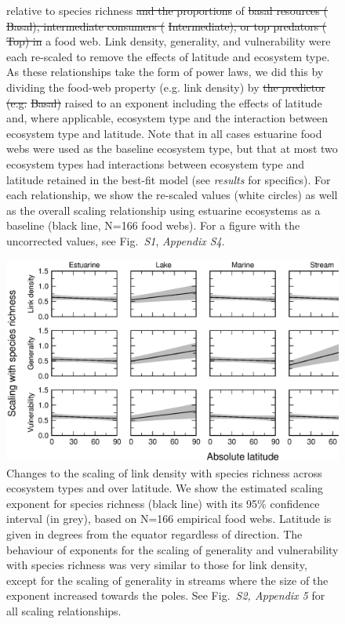 \documentclass[12pt]{article}
\providecommand{\DIFadd}[1]{{\protect\color{blue}\uwave{#1}}} %
\providecommand{\DIFdel}[1]{{\protect\color{red}\sout{#1}}}                      %
\providecommand{\DIFaddFL}[1]{\DIFadd{#1}} %
\providecommand{\DIFdelFL}[1]{\DIFdel{#1}} %
\providecommand{\DIFaddbeginFL}{} %
\providecommand{\DIFaddendFL}{} %
\providecommand{\DIFdelbeginFL}{} %
\providecommand{\DIFdelendFL}{} %
\begin{document}
\begin{figure}[h]
{relative to \DIFaddbeginFL \DIFaddFL{the }\DIFaddendFL species richness \DIFdelbeginFL \DIFdelFL{and the proportions }\DIFdelendFL of \DIFdelbeginFL \DIFdelFL{basal resources (}%
\DIFdelFL{Basal), intermediate 
consumers (}%
\DIFdelFL{Intermediate), or top predators (}%
\DIFdelFL{Top) in }\DIFdelendFL a food web. Link density, generality,
and vulnerability were each re-scaled to remove the effects of latitude and ecosystem
type. As these relationships take the form of power laws, we did this by dividing the food-web
property (e.g. link density) by \DIFdelbeginFL \DIFdelFL{the predictor (e.g. }%
\DIFdelFL{Basal) }\DIFdelendFL \DIFaddbeginFL \DIFaddFL{species richness }\DIFaddendFL raised to an exponent including the 
effects of latitude and, where applicable, ecosystem type and the interaction between ecosystem
type and latitude. Note that in all cases estuarine food webs were used as the baseline 
ecosystem type, but that at most two ecosystem types had interactions between ecosystem type and
latitude retained in the best-fit model (see \emph{results} for specifics). For each relationship, 
we show the re-scaled values (white circles) as well as the overall scaling relationship using estuarine
ecosystems as a baseline (black line, N=166 food webs). For a figure with the uncorrected values,
see Fig.~\emph{S1}, \emph{Appendix S4}.}
\label{props_v_lat}
\end{figure}


\begin{figure}[h]
\DIFaddbeginFL \centerline{\includegraphics*[width=.85\textwidth]{Figures/by_TL/marginal/S_marginal_latitude_proportions.eps}}
\DIFaddendFL \caption{Changes to the scaling of link density with species richness across ecosystem
types and over latitude. We show the estimated scaling exponent for species richness (black
line) with its 95\% confidence interval (in grey), based on N=166 empirical food webs.
Latitude is given in degrees from the equator regardless of direction. The
behaviour of exponents for the scaling of generality and vulnerability with
species richness was very  similar to those for link density, except for the
scaling of generality in streams where  the size of the exponent increased
towards the poles. See Fig.~\emph{S2, Appendix 5} for  all scaling
relationships.} \label{S} \end{figure}
\end{document}
